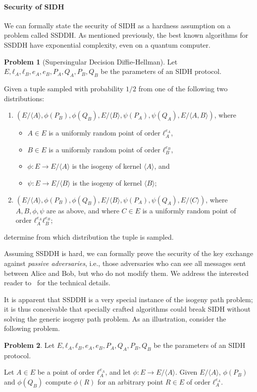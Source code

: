 \documentclass[10pt]{article}
\theoremstyle{plain}
\theoremstyle{definition}
\newtheorem{problem}{Problem}
\begin{document}
\paragraph{Security of SIDH}
We can formally state the security of SIDH as a hardness assumption on
a problem called SSDDH. %
As mentioned previously, the best known algorithms for SSDDH have
exponential complexity, even on a quantum computer.

\begin{problem}[Supersingular Decision Diffie-Hellman]
  Let $E,ℓ_A,ℓ_B,e_A,e_B,P_A,Q_A,P_B,Q_B$ be the parameters of an SIDH
  protocol.

  Given a tuple sampled with probability $1/2$ from one of
  the following two distributions:
  \begin{enumerate} 
  \item $(E/〈A〉, ϕ(P_B), ϕ(Q_B), E/〈B〉, ψ(P_A), ψ(Q_A), E/〈A,B〉)$, where
    \begin{itemize}
    \item $A∈E$ is a uniformly random point of order $ℓ_A^{e_A}$,
    \item $B∈E$ is a uniformly random point of order $ℓ_B^{e_B}$,
    \item $ϕ:E\to E/〈A〉$ is the isogeny of kernel $〈A〉$, and
    \item $ψ:E \to E/〈B〉$ is the isogeny of kernel $〈B〉$;
    \end{itemize}
  \item $(E/〈A〉, ϕ(P_B), ϕ(Q_B), E/〈B〉, ψ(P_A), ψ(Q_A), E/〈C〉)$,
    where $A,B,ϕ,ψ$ are as above, and where $C∈E$ is a uniformly random
    point of order $ℓ_A^{e_A}ℓ_B^{e_B}$;
  \end{enumerate}
  determine from which distribution the tuple is sampled.
\end{problem}

Assuming SSDDH is hard, we can formally prove the security of the key
exchange against \emph{passive adversaries}, i.e., those adversaries
who can see all messages sent between Alice and Bob, but who do not
modify them. %
We address the interested reader to~\cite{defeo+jao+plut12} for the
technical details.

It is apparent that SSDDH is a very special instance of the isogeny
path problem; it is thus conceivable that specially crafted algorithms
could break SIDH without solving the generic isogeny path problem. %
As an illustration, consider the following problem.

\begin{problem}
  Let $E,ℓ_A,ℓ_B,e_A,e_B,P_A,Q_A,P_B,Q_B$ be the parameters of an SIDH
  protocol.

  Let $A∈E$ be a point of order $ℓ_A^{e_A}$, and let $ϕ:E\to E/〈A〉$. %
  Given $E/〈Α〉$, $ϕ(P_B)$ and $ϕ(Q_B)$ compute $ϕ(R)$ for an
  arbitrary point $R∈E$ of order $ℓ_A^{e_A}$.
\end{problem}
\end{document}

